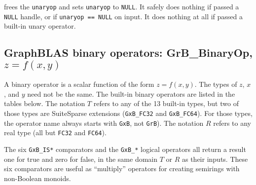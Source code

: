 \documentclass[12pt]{article}
\begin{document}
{\noindent
frees the \verb'unaryop' and sets \verb'unaryop' to \verb'NULL'.
It safely does nothing if passed a \verb'NULL'
handle, or if \verb'unaryop == NULL' on input.
It does nothing at all if passed a built-in unary operator.

\newpage
\subsection{GraphBLAS binary operators: {\sf GrB\_BinaryOp}, $z=f(x,y)$} %
\label{binaryop}

A binary operator is a scalar function of the form $z=f(x,y)$.  The types of
$z$, $x$, and $y$ need not be the same.  The built-in binary operators are
listed in the tables below.  The notation $T$ refers to any of the 13
built-in types, but two of those types are SuiteSparse extensions
(\verb'GxB_FC32' and \verb'GxB_FC64').  For those types, the operator name
always starts with \verb'GxB', not \verb'GrB').
The notation $R$ refers to any real type (all but \verb'FC32' and \verb'FC64').

The six \verb'GxB_IS*' comparators and the \verb'GxB_*' logical
operators all return a result one for true and zero for false, in the same
domain $T$ or $R$ as their inputs.  These six comparators are useful
as ``multiply'' operators for creating semirings with non-Boolean monoids.

}
\end{document}
